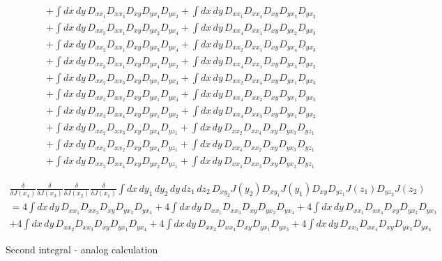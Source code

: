 \documentclass[10pt,a4paper]{article}
\theoremstyle{definition}
\begin{document}
\begin{enumerate}[1)]
\begin{align}
%
+\int dx\,dy\,D_{xx_1}D_{xx_3} D_{xy}D_{yx_4}D_{yx_2}
+\int dx\,dy\,D_{xx_1}D_{xx_4} D_{xy}D_{yx_3}D_{yx_2}\\
%
+\int dx\,dy\,D_{xx_3}D_{xx_1} D_{xy}D_{yx_2}D_{yx_4}
+\int dx\,dy\,D_{xx_4}D_{xx_1} D_{xy}D_{yx_2}D_{yx_3}\\
%
+\int dx\,dy\,D_{xx_2}D_{xx_1} D_{xy}D_{yx_3}D_{yx_4}
+\int dx\,dy\,D_{xx_2}D_{xx_1} D_{xy}D_{yx_4}D_{yx_3}\\
%
+\int dx\,dy\,D_{xx_3}D_{xx_1} D_{xy}D_{yx_4}D_{yx_2}
+\int dx\,dy\,D_{xx_4}D_{xx_1} D_{xy}D_{yx_3}D_{yx_2}\\
%
+\int dx\,dy\,D_{xx_2}D_{xx_3} D_{xy}D_{yx_1}D_{yx_4}
+\int dx\,dy\,D_{xx_2}D_{xx_4} D_{xy}D_{yx_1}D_{yx_3}\\
%
+\int dx\,dy\,D_{xx_3}D_{xx_2} D_{xy}D_{yx_1}D_{yx_4}
+\int dx\,dy\,D_{xx_4}D_{xx_2} D_{xy}D_{yx_1}D_{yx_3}\\
%
+\int dx\,dy\,D_{xx_3}D_{xx_4}D_{xy}D_{yx_1}D_{yx_2}
+\int dx\,dy\,D_{xx_4}D_{xx_3}D_{xy}D_{yx_1}D_{yx_2}\\
%
+\int dx\,dy\,D_{xx_2}D_{xx_3} D_{xy}D_{yx_4}D_{yz_1}
+\int dx\,dy\,D_{xx_2}D_{xx_4}D_{xy}D_{yx_3}D_{yz_1}\\
%
+\int dx\,dy\,D_{xx_3}D_{xx_2} D_{xy}D_{yx_4}D_{yz_1}
+\int dx\,dy\,D_{xx_4}D_{xx_2} D_{xy}D_{yx_3}D_{yz_1}\\
%
+\int dx\,dy\,D_{xx_3}D_{xx_4} D_{xy}D_{yx_2}D_{yz_1}
+\int dx\,dy\,D_{xx_4}D_{xx_3} D_{xy}D_{yx_2}D_{yz_1}
\end{align}

\begin{align*}
\frac{\delta}{\delta J(x_4)}\frac{\delta}{\delta J(x_3)}\frac{\delta}{\delta J(x_2)}\frac{\delta}{\delta J(x_1)}\int dx\,dy_1\,dy_2\,dy\,dz_1\,dz_2\,D_{xy_2}J(y_2)D_{xy_1}J(y_1) D_{xy}D_{yz_1}J(z_1)D_{yz_2}J(z_2)\\
=4\int dx\,dy\,D_{xx_1}D_{xx_2} D_{xy}D_{yx_3}D_{yx_4}
+4\int dx\,dy\,D_{xx_1}D_{xx_3} D_{xy}D_{yx_2}D_{yx_4}
+4\int dx\,dy\,D_{xx_1}D_{xx_4} D_{xy}D_{yx_2}D_{yx_3}\\
+4\int dx\,dy\,D_{xx_2}D_{xx_3} D_{xy}D_{yx_1}D_{yx_4}
+4\int dx\,dy\,D_{xx_2}D_{xx_4} D_{xy}D_{yx_1}D_{yx_3}
+4\int dx\,dy\,D_{xx_3}D_{xx_4} D_{xy}D_{yx_3}D_{yx_4}
\end{align*}
\end{enumerate}
Second integral - analog calculation
\end{document}
